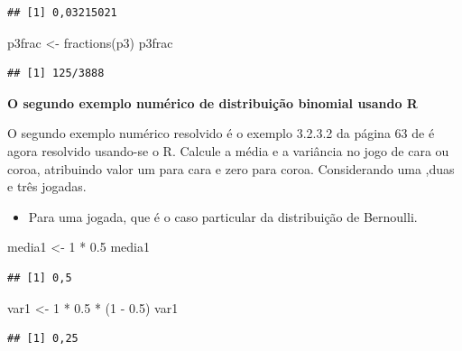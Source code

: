 \documentclass[
]{book}
\newenvironment{Shaded}{\begin{snugshade}}{\end{snugshade}}
\newcommand{\DecValTok}[1]{\textcolor[rgb]{0.00,0.00,0.81}{#1}}
\newcommand{\FloatTok}[1]{\textcolor[rgb]{0.00,0.00,0.81}{#1}}
\newcommand{\FunctionTok}[1]{\textcolor[rgb]{0.00,0.00,0.00}{#1}}
\newcommand{\NormalTok}[1]{#1}
\newcommand{\OtherTok}[1]{\textcolor[rgb]{0.56,0.35,0.01}{#1}}
\newcommand{\SpecialCharTok}[1]{\textcolor[rgb]{0.00,0.00,0.00}{#1}}
\providecommand{\tightlist}{%
  \setlength{\itemsep}{0pt}\setlength{\parskip}{0pt}}
\begin{document}
\begin{verbatim}
## [1] 0,03215021
\end{verbatim}

\begin{Shaded}
\begin{Highlighting}[]
\NormalTok{p3frac }\OtherTok{\textless{}{-}} \FunctionTok{fractions}\NormalTok{(p3)}
\NormalTok{p3frac}
\end{Highlighting}
\end{Shaded}

\begin{verbatim}
## [1] 125/3888
\end{verbatim}

\textbf{O segundo exemplo numérico de distribuição binomial usando R}

O segundo exemplo numérico resolvido é o exemplo 3.2.3.2 da página 63 de \citet{Sartoris2013} é agora resolvido usando-se o R. Calcule a média e a variância
no jogo de cara ou coroa, atribuindo valor um para cara e zero para coroa.
Considerando uma ,duas e três jogadas.

\begin{itemize}
\tightlist
\item
  Para uma jogada, que é o caso particular da distribuição de Bernoulli.
\end{itemize}

\begin{Shaded}
\begin{Highlighting}[]
\NormalTok{media1 }\OtherTok{\textless{}{-}} \DecValTok{1} \SpecialCharTok{*} \FloatTok{0.5}
\NormalTok{media1}
\end{Highlighting}
\end{Shaded}

\begin{verbatim}
## [1] 0,5
\end{verbatim}

\begin{Shaded}
\begin{Highlighting}[]
\NormalTok{var1 }\OtherTok{\textless{}{-}} \DecValTok{1} \SpecialCharTok{*} \FloatTok{0.5} \SpecialCharTok{*}\NormalTok{ (}\DecValTok{1} \SpecialCharTok{{-}} \FloatTok{0.5}\NormalTok{)}
\NormalTok{var1}
\end{Highlighting}
\end{Shaded}

\begin{verbatim}
## [1] 0,25
\end{verbatim}
\end{document}
